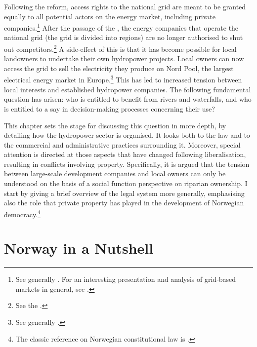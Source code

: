 Following the reform, access rights to the national grid are meant to be granted equally to all potential actors on the energy market, including private companies.\footnote{See generally \cite{hammer96}. For an interesting presentation and analysis of grid-based markets in general, see \cite{falch04}.} After the passage of the \cite{ea90}, the energy companies that operate the national grid (the grid is divided into regions) are no longer authorised to shut out competitors.\footnote{See the \dni\cite[3-4]{ea90}.} A side-effect of this is that it has become possible for local landowners to undertake their own hydropower projects. Local owners can now access the grid to sell the electricity they produce on Nord Pool, the largest electrical energy market in Europe.\footnote{See generally \cite{larsen06,larsen08,larsen12}.} This has led to increased tension between local interests and established hydropower companies. The following fundamental question has arisen: who is entitled to benefit from rivers and waterfalls, and who is entitled to a say in decision-making processes concerning their use?

This chapter sets the stage for discussing this question in more depth, by detailing how the hydropower sector is organised. It looks both to the law and to the commercial and administrative practices surrounding it. Moreover, special attention is directed at those aspects that have changed following liberalisation, resulting in conflicts involving property. Specifically, it is argued that the tension between large-scale development companies and local owners can only be understood on the basis of a social function perspective on riparian ownership. I start by giving a brief overview of the legal system more generally, emphasising also the role that private property has played in the development of Norwegian democracy.\footnote{The classic reference on Norwegian constitutional law is \cite{andenes06}.}

\section{Norway in a Nutshell}\label{sec:4:2}


